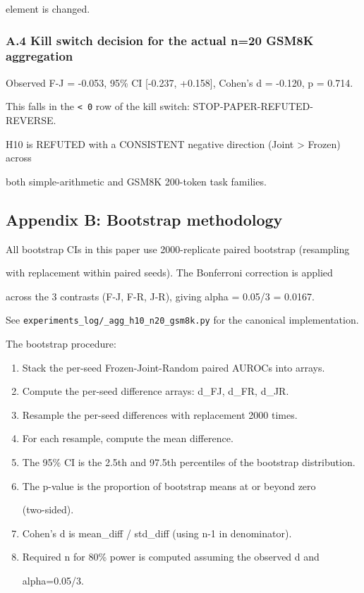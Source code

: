 \documentclass[
]{article}
\begin{document}
element is changed.

\subsubsection{A.4 Kill switch decision for the actual n=20 GSM8K
aggregation}\label{a.4-kill-switch-decision-for-the-actual-n20-gsm8k-aggregation}

Observed F-J = -0.053, 95\% CI {[}-0.237, +0.158{]}, Cohen's d = -0.120,
p = 0.714.

This falls in the \texttt{\textless{}\ 0} row of the kill switch:
STOP-PAPER-REFUTED-REVERSE.

H10 is REFUTED with a CONSISTENT negative direction (Joint
\textgreater{} Frozen) across

both simple-arithmetic and GSM8K 200-token task families.

\subsection{Appendix B: Bootstrap
methodology}\label{appendix-b-bootstrap-methodology}

All bootstrap CIs in this paper use 2000-replicate paired bootstrap
(resampling

with replacement within paired seeds). The Bonferroni correction is
applied

across the 3 contrasts (F-J, F-R, J-R), giving alpha = 0.05/3 = 0.0167.

See \texttt{experiments\_log/\_agg\_h10\_n20\_gsm8k.py} for the
canonical implementation.

The bootstrap procedure:

\begin{enumerate}
\def\labelenumi{\arabic{enumi}.}
\item
  Stack the per-seed Frozen-Joint-Random paired AUROCs into arrays.
\item
  Compute the per-seed difference arrays: d\_FJ, d\_FR, d\_JR.
\item
  Resample the per-seed differences with replacement 2000 times.
\item
  For each resample, compute the mean difference.
\item
  The 95\% CI is the 2.5th and 97.5th percentiles of the bootstrap
  distribution.
\item
  The p-value is the proportion of bootstrap means at or beyond zero

  (two-sided).
\item
  Cohen's d is mean\_diff / std\_diff (using n-1 in denominator).
\item
  Required n for 80\% power is computed assuming the observed d and

  alpha=0.05/3.
\end{enumerate}
\end{document}
